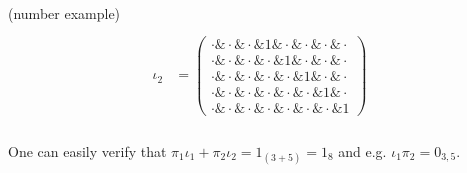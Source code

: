 \begin{example}{(number example)}
\begin{align*}
\begin{array}{rr}
\\
\iota_{2} &= \begin{pmatrix}
\cdot \ampersand \cdot \ampersand \cdot \ampersand 1 \ampersand \cdot \ampersand \cdot \ampersand \cdot \ampersand \cdot \\
\cdot \ampersand \cdot \ampersand \cdot \ampersand \cdot \ampersand 1 \ampersand \cdot \ampersand \cdot \ampersand \cdot \\
\cdot \ampersand \cdot \ampersand \cdot \ampersand \cdot \ampersand \cdot \ampersand 1 \ampersand \cdot \ampersand \cdot \\
\cdot \ampersand \cdot \ampersand \cdot \ampersand \cdot \ampersand \cdot \ampersand \cdot \ampersand 1 \ampersand \cdot \\
\cdot \ampersand \cdot \ampersand \cdot \ampersand \cdot \ampersand \cdot \ampersand \cdot \ampersand \cdot \ampersand 1
\end{pmatrix}
\end{array}
\end{align*}\\
\noindent One can easily verify that $\pi_{1} \iota_{1} + \pi_{2} \iota_{2} = 1_{(3+5)} = 1_{8}$ and e.g. $\iota_{1} \pi_{2} = 0_{3,5}$.\\


\end{example}
